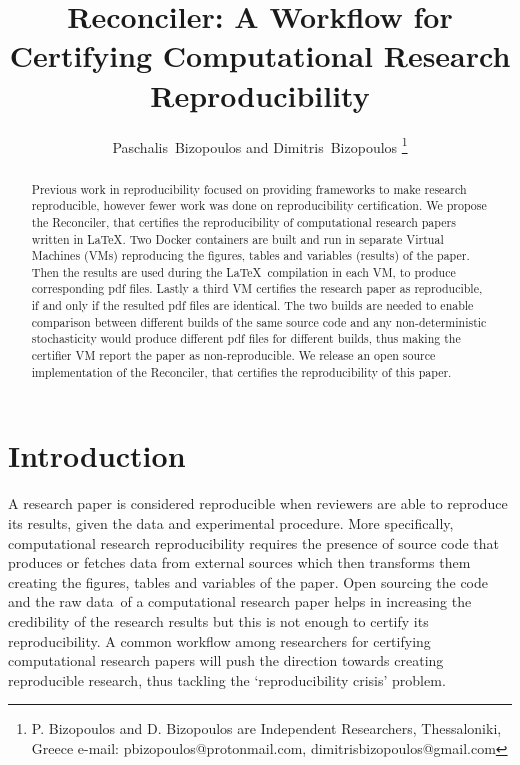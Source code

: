 \documentclass[journal]{IEEEtran}
\begin{document}

\title{Reconciler: A Workflow for Certifying Computational Research Reproducibility}

\author{Paschalis~Bizopoulos and Dimitris~Bizopoulos
\thanks{P. Bizopoulos and D. Bizopoulos are Independent Researchers, Thessaloniki, Greece e-mail: pbizopoulos@protonmail.com, dimitrisbizopoulos@gmail.com}}

\maketitle

\begin{abstract}
	Previous work in reproducibility focused on providing frameworks to make research reproducible, however fewer work was done on reproducibility certification.
	We propose the Reconciler, that certifies the reproducibility of computational research papers written in \LaTeX.
	Two Docker containers are built and run in separate Virtual Machines (VMs) reproducing the figures, tables and variables (results) of the paper.
	Then the results are used during the \LaTeX\ compilation in each VM, to produce corresponding pdf files.
	Lastly a third VM certifies the research paper as reproducible, if and only if the resulted pdf files are identical.
	The two builds are needed to enable comparison between different builds of the same source code and any non-deterministic stochasticity would produce different pdf files for different builds, thus making the certifier VM report the paper as non-reproducible.
	We release an open source implementation of the Reconciler, that certifies the reproducibility of this paper.
\end{abstract}

\section{Introduction}
A research paper is considered reproducible when reviewers are able to reproduce its results, given the data and experimental procedure.
More specifically, computational research reproducibility requires the presence of source code that produces or fetches data from external sources which then transforms them creating the figures, tables and variables of the paper.
Open sourcing the code and the raw data of a computational research paper helps in increasing the credibility of the research results but this is not enough to certify its reproducibility.
A common workflow among researchers for certifying computational research papers will push the direction towards creating reproducible research, thus tackling the `reproducibility crisis' problem.
\end{document}
